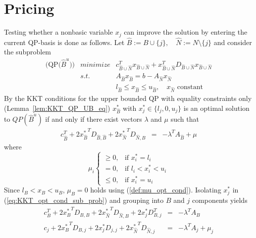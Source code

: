 \documentclass[a4paper]{article}
\begin{document}
\section{Pricing}
Testing whether a nonbasic variable $x_{j}$ can improve the solution by entering the current QP-basis is done as follows.
Let $\hat{B}:=B \cup \{j\}, \quad \hat{N}:=N \setminus \{j\}$ and consider the subproblem
\begin{eqnarray}
  \mbox{(QP($\hat{B}^{u}$))} &minimize& c_{\hat{B} \cup \hat{N}}^{T}
    x_{\hat{B} \cup \hat{N}} +
    x_{\hat{B} \cup \hat{N}}^{T}
    D_{\hat{B} \cup \hat{N}}x_{\hat{B} \cup \hat{N}}
\nonumber      \\
\label{eq:QP_UB_sub_feas_cons}
    & s.t. & A_{\hat{B}}x_{\hat{B}} = b - A_{\hat{N}}
    x_{\hat{N}}  \\
\label{eq:QP_UB_sub_var_feas_cons}
    & & l_{\hat{B}} \leq x_{\hat{B}} \leq u_{\hat{B}},
    \quad x_{\hat{N}} \text{ constant}  
\end{eqnarray}
By the KKT conditions for the upper bounded QP with equality constraints only (Lemma~\ref{lem:KKT_QP_UB_eq}) $x_{\hat{B}}^{*}$ with
$x_{j}^{*} \in \{l_{j}, 0, u_{j}\}$
is an optimal solution to $QP(\hat{B}^{u})$ if and only if there exist vectors
$\lambda$ and $\mu$ such that
\begin{eqnarray}
\label{eq:KKT_opt_cond_sub_prob}
c_{\hat{B}}^{T}+2{x_{\hat{B}}^{*}}^{T}D_{\hat{B}, \hat{B}}
+2{x_{\hat{N}}^{*}}^{T}D_{\hat{N}, \hat{B}}
& = &
-\lambda^{T}A_{\hat{B}}+\mu 
\end{eqnarray}
where
\begin{equation}
\label{eq:KKT_opt_cond_sub_prob_mu}
\mu_{i}
\left\{
\begin{array}{ll}
\geq 0,
&
\text{if $x_{i}^{*}=l_{i}$} \\
=0,
&
\text{if $l_{i} < x_{i}^{*} < u_{i}$} \\
\leq 0,
&
\text{if $x_{i}^{*}=u_{i}$}
\end{array}
\right.
\end{equation}
Since $l_{B} < x_{B} < u_{B}$, $\mu_{B}=0$ holds using (\ref{def:mu_opt_cond}).
Isolating $x_{j}^{*}$ in (\ref{eq:KKT_opt_cond_sub_prob}) and grouping into $B$
and $j$ components yields
\begin{eqnarray}
\label{eq:KKT_lagrange_id_B}
  c_{B}^{T} + {2x_{B}^{*}}^{T}D_{B,B}
  + 2{x_{\hat{N}}^{*}}^{T}D_{\hat{N},B}
  + 2x_{j}^{*}D_{B,j}^{T} & = & -\lambda^{T} A_{B} \\
\label{eq:KKT_lagrange_id_j}
  c_{j} + 2{x_{B}^{*}}^{T}D_{B,j}
  + 2x_{j}^{*}D_{j,j}
  + 2{x_{\hat{N}}^{*}}^{T}D_{\hat{N},j} & = &
  -\lambda^{T} A_{j} + \mu_{j}
\end{eqnarray}
\end{document}
